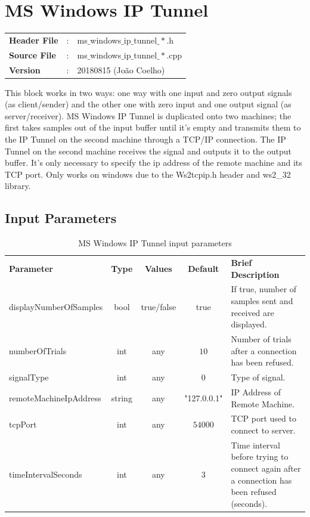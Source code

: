 \clearpage

\section{MS Windows IP Tunnel}

\begin{tcolorbox}	
	\begin{tabular}{p{2.75cm} p{0.2cm} p{10.5cm}} 	
		\textbf{Header File}   &:& ms$\_$windows$\_$ip$\_$tunnel$\_*$.h \\
		\textbf{Source File}   &:& ms$\_$windows$\_$ip$\_$tunnel$\_*$.cpp \\
        \textbf{Version}       &:& 20180815 (Jo\~ao Coelho) \\
	\end{tabular}
\end{tcolorbox}

This block works in two ways: one way with one input and zero output signals (as client/sender) and the other one with zero input and one output signal (as server/receiver).
MS Windows IP Tunnel is duplicated onto two machines; the first takes samples out of the input buffer until it's empty and transmits them to the IP Tunnel on the second machine through a TCP/IP connection. The IP Tunnel on the second machine receives the signal and outputs it to the output buffer.
It's only necessary to specify the ip address of the remote machine and its TCP port.
Only works on windows due to the Ws2tcpip.h header and ws2\_32 library.

\subsection*{Input Parameters}

\begin{table}[h]
	\centering
	\begin{tabular}{|l|c|c|c|p{50mm}|}
		\cline{1-5}
		\textbf{Parameter} & \textbf{Type} & \textbf{Values} &   \textbf{Default}& \textbf{Brief Description} \\ \cline{1-5}
		
        displayNumberOfSamples & bool & true/false & true & If true, number of samples sent and received are displayed.\\ \cline{1-5}
		numberOfTrials & int & any & $10$ & Number of trials after a connection has been refused.\\ \cline{1-5}
		signalType & int & any & $0$ & Type of signal.\\ \cline{1-5}
		remoteMachineIpAddress & string & any & "127.0.0.1" & IP Address of Remote Machine.\\ \cline{1-5}
		tcpPort & int & any & $54000$ & TCP port used to connect to server.\\ \cline{1-5}
		timeIntervalSeconds & int & any & $3$ & Time interval before trying to connect again after a connection has been refused (seconds).\\ \cline{1-5}
	\end{tabular}
	\caption{MS Windows IP Tunnel input parameters}
	\label{table:ipt_in_par}
\end{table}

